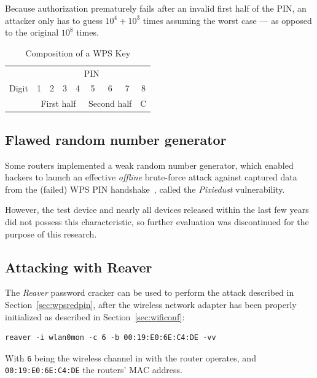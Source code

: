 Because authorization prematurely fails after an invalid first half of the PIN, an attacker only has to guess $10^4 + 10^3$ times assuming the worst case --- as opposed to the original $10^8$ times.

\begin{table}[]
\centering
\caption{Composition of a WPS Key}\label{tbl:wpskey}
\begin{tabular}{l|c|c|c|c|c|c|c|l|}
\cline{2-9}
 & \multicolumn{8}{c|}{PIN} \\ \cline{2-9} 
Digit & 1 & 2 & 3 & 4 & 5 & 6 & 7 & \multicolumn{1}{c|}{8} \\ \cline{2-9} 
 & \multicolumn{4}{c|}{First half} & \multicolumn{3}{c|}{Second half} & C \\ \cline{2-9} 
\end{tabular}
\end{table}

\subsection{Flawed random number generator}

Some routers implemented a weak random number generator, which enabled hackers to launch an effective \emph{offline} brute-force attack against captured data from the (failed) WPS PIN handshake~\cite{Bongard14}, called the \emph{Pixiedust} vulnerability.

However, the test device and nearly all devices released within the last few years did not possess this characteristic, so further evaluation was discontinued for the purpose of this research.

\subsection{Attacking with Reaver}

The \emph{Reaver} password cracker can be used to perform the attack described in Section~\ref{sec:wpsredpin}, after the wireless network adapter has been properly initialized as described in Section~\ref{sec:wificonf}:

\begin{lstlisting}[basicstyle=\ttfamily]
reaver -i wlan0mon -c 6 -b 00:19:E0:6E:C4:DE -vv
\end{lstlisting}

With \lstinline[basicstyle=\ttfamily]{6} being the wireless channel in with the router operates, and \lstinline[basicstyle=\ttfamily]{00:19:E0:6E:C4:DE} the routers' MAC address. 


